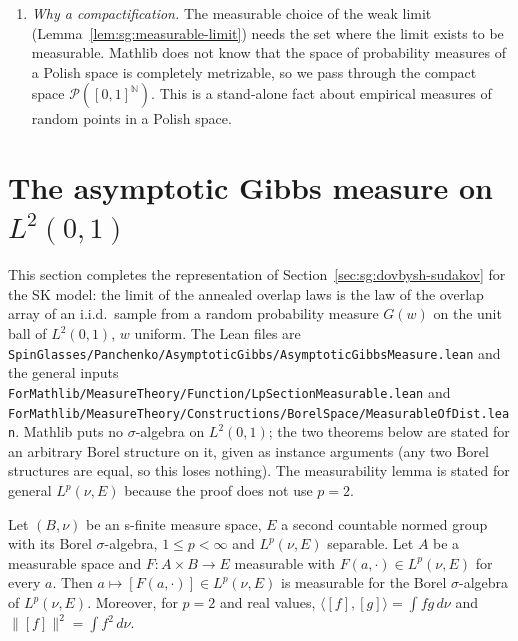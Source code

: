 \begin{remark}
\begin{enumerate}
\item \emph{Why a compactification.} The measurable choice of the weak limit (Lemma~\ref{lem:sg:measurable-limit}) needs the set where the limit exists to be measurable. Mathlib does not know that the space of probability measures of a Polish space is completely metrizable, so we pass through the compact space $\mathcal P([0,1]^{\mathbb N})$. This is a stand-alone fact about empirical measures of random points in a Polish space.
\end{enumerate}
\end{remark}

\section{The asymptotic Gibbs measure on $L^2(0,1)$}\label{sec:sg:gibbs-measure}

This section completes the representation of Section~\ref{sec:sg:dovbysh-sudakov} for the SK model: the limit of the annealed overlap laws is the law of the overlap array of an i.i.d.\ sample from a random probability measure $G(w)$ on the unit ball of $L^2(0,1)$, $w$ uniform.
The Lean files are \texttt{SpinGlasses/Panchenko/AsymptoticGibbs/AsymptoticGibbsMeasure.lean} and the general inputs \texttt{ForMathlib/MeasureTheory/Function/LpSectionMeasurable.lean} and \texttt{ForMathlib/MeasureTheory/Constructions/BorelSpace/MeasurableOfDist.lean}.
Mathlib puts no $\sigma$-algebra on $L^2(0,1)$; the two theorems below are stated for an arbitrary Borel structure on it, given as instance arguments (any two Borel structures are equal, so this loses nothing). The measurability lemma is stated for general $L^p(\nu,E)$ because the proof does not use $p=2$.

\begin{lemma}\label{lem:sg:lp-section}
  \leanok
Let $(B,\nu)$ be an s-finite measure space, $E$ a second countable normed group with its Borel $\sigma$-algebra, $1\le p<\infty$ and $L^p(\nu,E)$ separable. Let $A$ be a measurable space and $F:A\times B\to E$ measurable with $F(a,\cdot)\in L^p(\nu,E)$ for every $a$. Then $a\mapsto[F(a,\cdot)]\in L^p(\nu,E)$ is measurable for the Borel $\sigma$-algebra of $L^p(\nu,E)$. Moreover, for $p=2$ and real values, $\langle[f],[g]\rangle=\int fg\,d\nu$ and $\|[f]\|^2=\int f^2\,d\nu$.
\end{lemma}

